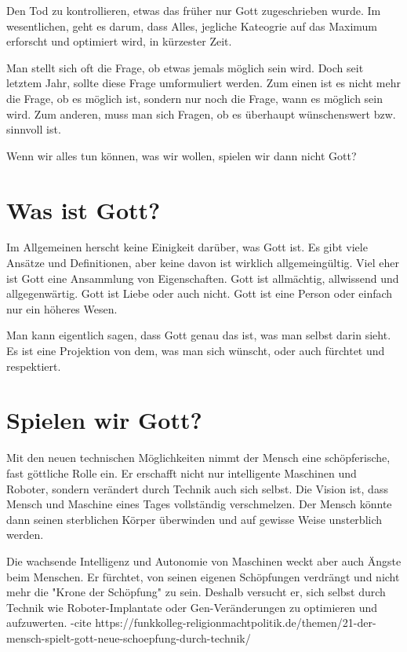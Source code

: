 \documentclass[10pt]{article}
\begin{document}
Den Tod zu kontrollieren, etwas das früher nur Gott zugeschrieben wurde.
Im wesentlichen, geht es darum, dass Alles, jegliche Kateogrie auf das Maximum erforscht und optimiert wird, in kürzester Zeit.

\cite{Kurzweil}

Man stellt sich oft die Frage, ob etwas jemals möglich sein wird.
Doch seit letztem Jahr, sollte diese Frage umformuliert werden.
Zum einen ist es nicht mehr die Frage, ob es möglich ist, sondern nur noch die Frage, wann es möglich sein wird.
Zum anderen, muss man sich Fragen, ob es überhaupt wünschenswert bzw. sinnvoll ist.

Wenn wir alles tun können, was wir wollen, spielen wir dann nicht Gott?
\section{Was ist Gott?}
Im Allgemeinen herscht keine Einigkeit darüber, was Gott ist.
Es gibt viele Ansätze und Definitionen, aber keine davon ist wirklich allgemeingültig.
Viel eher ist Gott eine Ansammlung von Eigenschaften.
Gott ist allmächtig, allwissend und allgegenwärtig.
Gott ist Liebe oder auch nicht.
Gott ist eine Person oder einfach nur ein höheres Wesen.



Man kann eigentlich sagen, dass Gott genau das ist, was man selbst darin sieht.
Es ist eine Projektion von dem, was man sich wünscht, oder auch fürchtet und respektiert.

\cite{gottkennen}
\cite{Jesushaus}

\section{Spielen wir Gott?}
Mit den neuen technischen Möglichkeiten nimmt der Mensch eine schöpferische, fast göttliche Rolle ein. Er erschafft nicht nur intelligente Maschinen und Roboter, sondern verändert durch Technik auch sich selbst. Die Vision ist, dass Mensch und Maschine eines Tages vollständig verschmelzen. Der Mensch könnte dann seinen sterblichen Körper überwinden und auf gewisse Weise unsterblich werden.

Die wachsende Intelligenz und Autonomie von Maschinen weckt aber auch Ängste beim Menschen. Er fürchtet, von seinen eigenen Schöpfungen verdrängt und nicht mehr die "Krone der Schöpfung" zu sein. Deshalb versucht er, sich selbst durch Technik wie Roboter-Implantate oder Gen-Veränderungen zu optimieren und aufzuwerten.
-cite https://funkkolleg-religionmachtpolitik.de/themen/21-der-mensch-spielt-gott-neue-schoepfung-durch-technik/
\end{document}
